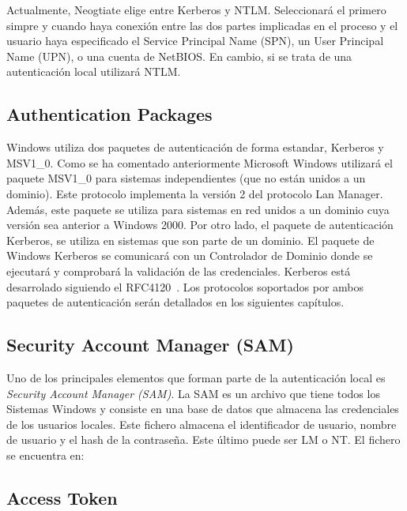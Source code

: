 Actualmente, Neogtiate elige entre Kerberos y NTLM. Seleccionará el primero simpre y cuando haya conexión entre las dos partes implicadas en el proceso y el usuario haya especificado el Service Principal Name (SPN), un User Principal Name (UPN), o una cuenta de NetBIOS. En cambio, si se trata de una autenticación local utilizará NTLM.

\subsection{Authentication Packages}

Windows utiliza dos paquetes de autenticación de forma estandar, Kerberos y MSV1\_0. Como se ha comentado anteriormente Microsoft Windows utilizará el paquete MSV1\_0 para sistemas independientes (que no están unidos a un dominio). Este protocolo implementa la versión 2 del protocolo Lan Manager. Además, este paquete se utiliza para sistemas en red unidos a un dominio cuya versión sea anterior a Windows 2000. Por otro lado, el paquete de autenticación Kerberos, se utiliza en sistemas que son parte de un dominio. El paquete de Windows Kerberos se comunicará con un Controlador de Dominio donde se ejecutará y comprobará la validación de las credenciales. Kerberos está desarrolado siguiendo el RFC4120~\cite{Capitulo2:Kerberos}. Los protocolos soportados por ambos paquetes de autenticación serán detallados en los siguientes capítulos.

\subsection{Security Account Manager (SAM)}

Uno de los principales elementos que forman parte de la autenticación local es {\it Security Account Manager (SAM)}. La SAM es un archivo que tiene todos los Sistemas Windows y consiste en una base de datos que almacena las credenciales de los usuarios locales. Este fichero almacena el identificador de usuario, nombre de usuario y el hash de la contraseña. Este último puede ser LM o NT. El fichero se encuentra en:

\begin{listing}[style=consola, numbers=none]
\end{listing}

\subsection{Access Token}

